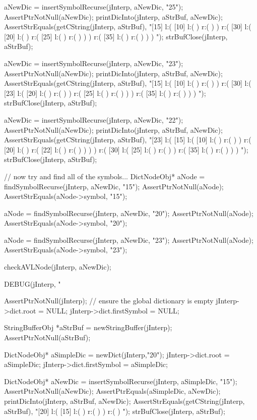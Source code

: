   aNewDic = insertSymbolRecurse(jInterp, aNewDic, "25");
  AssertPtrNotNull(aNewDic);
  printDicInto(jInterp, aStrBuf, aNewDic);
  AssertStrEquals(getCString(jInterp, aStrBuf),
  "[15] l:( [10] l:(  ) r:(  )  ) r:( [30] l:( [20] l:(  ) r:( [25] l:(  ) r:(  )  )  ) r:( [35] l:(  ) r:(  )  )  ) ");
  strBufClose(jInterp, aStrBuf);

  aNewDic = insertSymbolRecurse(jInterp, aNewDic, "23");
  AssertPtrNotNull(aNewDic);
  printDicInto(jInterp, aStrBuf, aNewDic);
  AssertStrEquals(getCString(jInterp, aStrBuf),
  "[15] l:( [10] l:(  ) r:(  )  ) r:( [30] l:( [23] l:( [20] l:(  ) r:(  )  ) r:( [25] l:(  ) r:(  )  )  ) r:( [35] l:(  ) r:(  )  )  ) ");
  strBufClose(jInterp, aStrBuf);
  
  aNewDic = insertSymbolRecurse(jInterp, aNewDic, "22");
  AssertPtrNotNull(aNewDic);
  printDicInto(jInterp, aStrBuf, aNewDic);
  AssertStrEquals(getCString(jInterp, aStrBuf),
  "[23] l:( [15] l:( [10] l:(  ) r:(  )  ) r:( [20] l:(  ) r:( [22] l:(  ) r:(  )  )  )  ) r:( [30] l:( [25] l:(  ) r:(  )  ) r:( [35] l:(  ) r:(  )  )  ) ");
  strBufClose(jInterp, aStrBuf);
  
  // now try and find all of the symbols...
  DictNodeObj* aNode = findSymbolRecurse(jInterp, aNewDic, "15");
  AssertPtrNotNull(aNode);
  AssertStrEquals(aNode->symbol, "15");

  aNode = findSymbolRecurse(jInterp, aNewDic, "20");
  AssertPtrNotNull(aNode);
  AssertStrEquals(aNode->symbol, "20");

  aNode = findSymbolRecurse(jInterp, aNewDic, "23");
  AssertPtrNotNull(aNode);
  AssertStrEquals(aNode->symbol, "23");

  checkAVLNode(jInterp, aNewDic);
\stopCTest
\stopTestCase


\startCTest
  DEBUG(jInterp, "\n%

  AssertPtrNotNull(jInterp);
  // ensure the global dictionary is empty
  jInterp->dict.root        = NULL;
  jInterp->dict.firstSymbol = NULL;

  StringBufferObj *aStrBuf = newStringBuffer(jInterp);
  AssertPtrNotNull(aStrBuf);
  
  DictNodeObj* aSimpleDic = newDict(jInterp,"20");
  jInterp->dict.root        = aSimpleDic;
  jInterp->dict.firstSymbol = aSimpleDic;

  DictNodeObj* aNewDic = insertSymbolRecurse(jInterp, aSimpleDic, "15");
  AssertPtrNotNull(aNewDic);
  AssertPtrEquals(aSimpleDic, aNewDic);
  printDicInto(jInterp, aStrBuf, aNewDic);
  AssertStrEquals(getCString(jInterp, aStrBuf),
  "[20] l:( [15] l:(  ) r:(  )  ) r:(  ) ");
  strBufClose(jInterp, aStrBuf);
  
